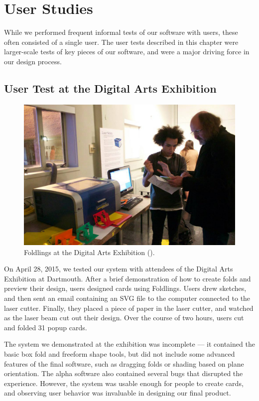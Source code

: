 \chapter{User Studies}

While we performed frequent informal tests of our software with users,
these often consisted of a single user. The user tests described in this
chapter were larger-scale tests of key pieces of our software, and were
a major driving force in our design process.

\section{User Test at the Digital Arts
Exhibition}\label{user-test-at-the-digital-arts-exhibition}

\begin{figure}[htbp]
\centering
\includegraphics{figures/50_User_Study_Dax/dax_facebook_credit_Julietta_Gervase}
\caption{Foldlings at the Digital Arts Exhibition (\citet{daxphoto}).}
\end{figure}

On April 28, 2015, we tested our system with attendees of the Digital
Arts Exhibition at Dartmouth. After a brief demonstration of how to
create folds and preview their design, users designed cards using
Foldlings. Users drew sketches, and then sent an email containing an SVG
file to the computer connected to the laser cutter. Finally, they placed
a piece of paper in the laser cutter, and watched as the laser beam cut
out their design. Over the course of two hours, users cut and folded 31
popup cards.

The system we demonstrated at the exhibition was incomplete --- it
contained the basic box fold and freeform shape tools, but did not
include some advanced features of the final software, such as dragging
folds or shading based on plane orientation. The alpha software also
contained several bugs that disrupted the experience. However, the
system was usable enough for people to create cards, and observing user
behavior was invaluable in designing our final product.

